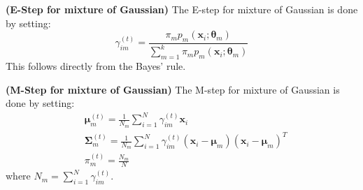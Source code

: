 \begin{proposition}{\textbf{(E-Step for mixture of Gaussian)}}
    The E-step for mixture of Gaussian is done by setting:
    \begin{equation*}
        \gamma_{im}^{(t)} = \frac{\pi_mp_m(\boldsymbol x_i ; \boldsymbol \theta_m)}{\sum^k_{m=1}\pi_mp_m(\boldsymbol x_i ; \boldsymbol \theta_m)} 
    \end{equation*}
    This follows directly from the Bayes' rule. 
\end{proposition}

\begin{proposition}{\textbf{(M-Step for mixture of Gaussian)}}
    The M-step for mixture of Gaussian is done by setting:
    \begin{equation*}
    \begin{aligned}
        &\boldsymbol \mu^{(t)}_m = \frac{1}{N_m}\sum^N_{i=1}\gamma_{im}^{(t)}\boldsymbol x_i \\
        &\boldsymbol \Sigma^{(t)}_m = \frac{1}{N_m}\sum^N_{i=1}\gamma_{im}^{(t)}(\boldsymbol x_i - \boldsymbol \mu_m)(\boldsymbol x_i-\boldsymbol \mu_m)^T \\
        &\pi_m^{(t)} = \frac{N_m}{N}
    \end{aligned}
    \end{equation*}
    where $N_m = \sum^N_{i=1}\gamma_{im}^{(t)}$.
\end{proposition}
